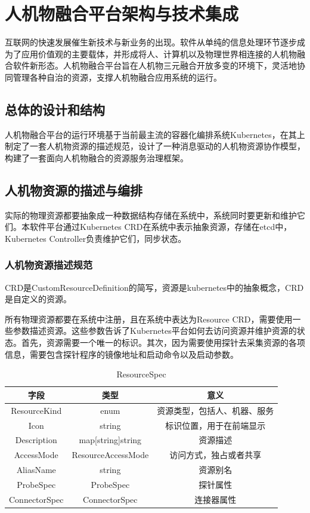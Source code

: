 \documentclass[12pt,a4paper]{article}
\theoremstyle{definition}
\begin{document}
\newpage
\section{人机物融合平台架构与技术集成} 

互联网的快速发展催生新技术与新业务的出现。软件从单纯的信息处理环节逐步成为了应用价值观的主要载体，并形成将人、计算机以及物理世界相连接的人机物融合软件新形态。人机物融合平台旨在人机物三元融合开放多变的环境下，灵活地协同管理各种自治的资源，支撑人机物融合应用系统的运行。

\subsection{总体的设计和结构}

人机物融合平台的运行环境基于当前最主流的容器化编排系统Kubernetes，在其上制定了一套人机物资源的描述规范，设计了一种消息驱动的人机物资源协作模型，构建了一套面向人机物融合的资源服务治理框架。

\subsection{人机物资源的描述与编排}
  实际的物理资源都要抽象成一种数据结构存储在系统中，系统同时要更新和维护它们。本软件平台通过Kubernetes CRD在系统中表示抽象资源，存储在etcd中，Kubernetes Controller负责维护它们，同步状态。
\subsubsection{人机物资源描述规范}
CRD是CustomResourceDefinition的简写，资源是kubernetes中的抽象概念，CRD是自定义的资源。

所有物理资源都要在系统中注册，且在系统中表达为Resource CRD，需要使用一些参数描述资源。这些参数告诉了Kubernetes平台如何去访问资源并维护资源的状态。首先，资源需要一个唯一的标识。其次，因为需要使用探针去采集资源的各项信息，需要包含探针程序的镜像地址和启动命令以及启动参数。

\begin{table}[!htbp]
\centering
\begin{tabular}{ccc}
  \toprule
  字段& 类型& 意义\\
  \midrule
  ResourceKind& enum& 资源类型，包括人、机器、服务\\
  Icon& string& 标识位置，用于在前端显示\\
  Description& map[string]string& 资源描述\\
  AccessMode& ResourceAccessMode& 访问方式，独占或者共享\\
  AliasName& string& 资源别名\\
  ProbeSpec& ProbeSpec& 探针属性\\
  ConnectorSpec& ConnectorSpec& 连接器属性\\
  \bottomrule
\end{tabular}
\caption{ResourceSpec}
\end{table}
\end{document}
